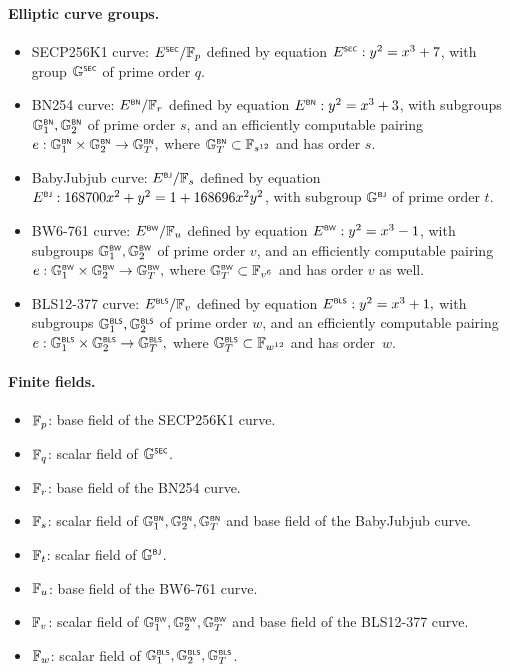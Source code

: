 \paragraph{Elliptic curve groups.}
\begin{itemize}
	\item SECP256K1 curve: $\SEC{E}/\F_p$ defined by equation $\SEC{E}: y^2 = x^3 + 7$, with group $\SEC{\G}$ of prime order $q$. 
	\item BN254 curve: $\BN{E}/\F_r$ defined by equation \( \BN{E}: y^2 = x^3 + 3\), with subgroups $\BN{\G}_1, \BN{\G}_2$ of prime order $s$, and an efficiently computable pairing \(e:\BN{\G}_1\times\BN{\G}_2 \rightarrow \BN{\G}_T,\) where $\BN{\G}_T \subset \F_{s^{12}}$ and has order $s$. 
	\item BabyJubjub curve: $\BJ{E}/\F_s$ defined by equation $\BJ{E}: 168700 x^2 + y^2 = 1 + 168696 x^2y^2$, with subgroup $\BJ{\G}$ of prime order $t$. 
	\item BW6-761 curve: $\BW{E}/\F_u$ defined by equation $\BW{E}: y^2 = x^3 - 1$, with subgroups $\BW{\G}_1, \BW{\G}_2$ of prime order $v$, and an efficiently computable pairing \({e}:\BW{\G}_1\times\BW{\G}_2 \rightarrow \BW{\G}_T,\) where $\BW{\G}_T \subset \F_{v^{6}}$ and has order $v$ as well. 
	\item BLS12-377 curve: $\BLS{E}/\F_v$ defined by equation \(\BLS{E}: y^2 = x^3 + 1,\) with subgroups $\BLS{\G}_1, \BLS{\G}_2$ of prime order $w$, and an efficiently computable pairing \({e}:\BLS{\G}_1\times\BLS{\G}_2 \rightarrow \BLS{\G}_T,\) where $\BLS{\G}_T \subset \F_{w^{12}}$ and has order~$w$. 
\end{itemize}

\paragraph{Finite fields.}
\begin{itemize}
	\item $\F_p$: base field of the SECP256K1 curve.
	\item $\F_q$: scalar field of $\SEC{\G}$.
	\item $\F_r$: base field of the BN254 curve.	
	\item $\F_s$: scalar field of $\BN{\G}_1, \BN{\G}_2, \BN{\G}_T$ and base field of the BabyJubjub curve.
	\item $\F_t$: scalar field of $\BJ{\G}$.
	\item $\F_u$: base field of the BW6-761 curve.
	\item $\F_v$: scalar field of $\BW{\G}_1, \BW{\G}_2, \BW{\G}_T$ and base field of the BLS12-377 curve.
	\item $\F_w$: scalar field of $\BLS{\G}_1, \BLS{\G}_2, \BLS{\G}_T$.
\end{itemize}


